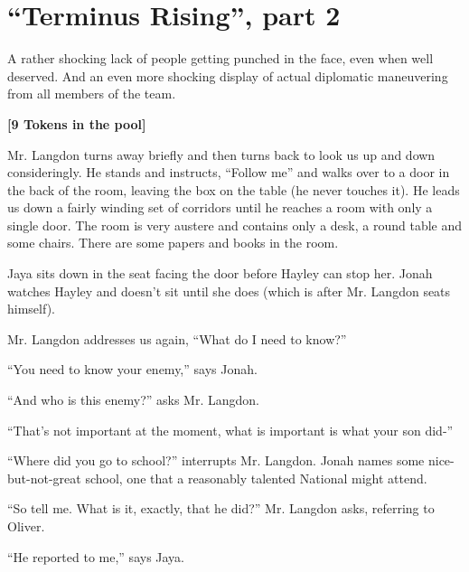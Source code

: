 \setcounter{chapter}{ 27 }
\chapter{\textbf{``Terminus Rising'', part 2} }






A rather shocking lack of people getting punched in the face, even when well deserved.  And an even more shocking display of actual diplomatic maneuvering from all members of the team.



\noindent\hrulefill





\textbf{{[}9 Tokens in the pool{]}}



Mr. Langdon turns away briefly and then turns back to look us up and down consideringly.  He stands and instructs, ``Follow me'' and walks over to a door in the back of the room, leaving the box on the table (he never touches it).  He leads us down a fairly winding set of corridors until he reaches a room with only a single door.  The room is very austere and contains only a desk, a round table and some chairs.  There are some papers and books in the room.



Jaya sits down in the seat facing the door before Hayley can stop her.  Jonah watches Hayley and doesn't sit until she does (which is after Mr. Langdon seats himself).



Mr. Langdon addresses us again, ``What do I need to know?''

``You need to know your enemy,'' says Jonah.

``And who is this enemy?'' asks Mr. Langdon.

``That's not important at the moment, what is important is what your son did-''

``Where did you go to school?'' interrupts Mr. Langdon.  Jonah names some nice-but-not-great school, one that a reasonably talented National might attend.

``So tell me.  What is it, exactly, that he did?'' Mr. Langdon asks, referring to Oliver.

``He reported to me,'' says Jaya.

